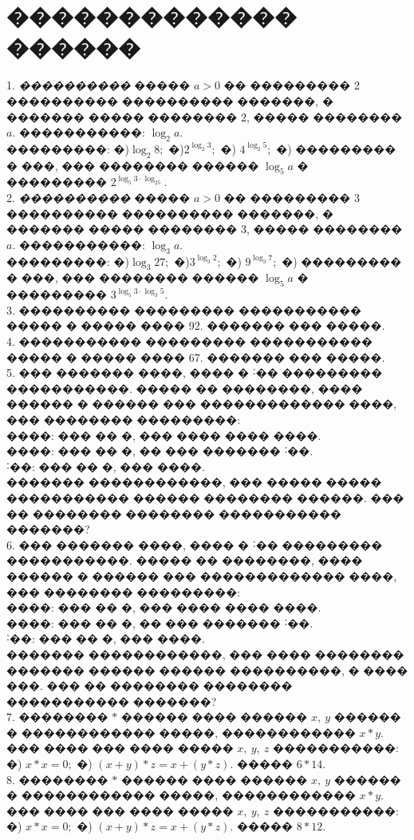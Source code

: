 \documentclass[12pt]{article}
\begin{document}
\section{������������� ������}
1. {\it ����������} ����� $a>0$ �� ��������� 2 ���������� ���������� �������, � ������� ����� �������� 2, ����� �������� $a.$ �����������: $\log_2 a.$\\
���������: �)$\log_2 8;$ �)$2^{\log_2 3};$ �) $4^{\log_2 5};$ �) ��������� � ���, ��� �������� ������ $\log_5 a$ � ��������� $2^{\log_5 3\cdot\log_25}.$\\
2. {\it ����������} ����� $a>0$ �� ��������� 3 ���������� ���������� �������, � ������� ����� �������� 3, ����� �������� $a.$ �����������: $\log_3 a.$\\
���������: �)$\log_3 27;$ �)$3^{\log_3 2};$ �) $9^{\log_3 7};$ �) ��������� � ���, ��� �������� ������ $\log_5 a$ � ��������� $3^{\log_5 3\cdot\log_3 5}.$\\
3. ���������� ��������� ����������� ����� � ����� ���� 92. ������� ��� �����.\\
4. ����������� ��������� ����������� ����� � ����� ���� 67. ������� ��� �����.\\
5. ��� ������� ����, ���� � ˸�� ��������� �����������. ����� �� ��������, ���� ������ � ������ ��� ������������� ����, ��� �������� ���������:\\
����: ��� �� �, ��� ���� ���� ����.\\
����: ��� �� �, �� ��� ������� ˸��.\\
˸��: ��� �� �, ��� ����.\\
������� ������������, ��� ����� ����� ����������� ������ �������� ������. ��� �� �������� �������� ����������� �������?\\
6. ��� ������� ����, ���� � ˸�� ��������� �����������. ����� �� ��������, ���� ������ � ������ ��� ������������� ����, ��� �������� ���������:\\
����: ��� �� �, ��� ���� ���� ����.\\
����: ��� �� �, �� ��� ������� ˸��.\\
˸��: ��� �� �, ��� ����.\\
������� ������������, ��� ���� �������� ������� ������ ������ ����������, � ���� ���. ��� �� �������� �������� ����������� �������?\\
7. �������� $*$ ������ ���� ������ $x,\ y$ ������ � ������������ �����, ������������ $x*y.$ ��� ���� ��� ���� ����� $x,\ y,\ z$ �����������: �) $x*x=0;$ �) $(x+y)*z=x+(y*z).$ ����� $6*14.$\\
8. �������� $*$ ������ ���� ������ $x,\ y$ ������ � ������������ �����, ������������ $x*y.$ ��� ���� ��� ���� ����� $x,\ y,\ z$ �����������: �) $x*x=0;$ �) $(x+y)*z=x+(y*z).$ ����� $8*12.$\\
\end{document}
